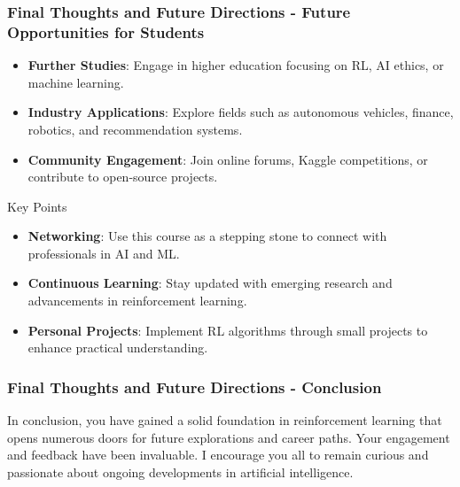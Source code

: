 \documentclass[aspectratio=169]{beamer}
\begin{document}
\begin{frame}[fragile]
    \frametitle{Final Thoughts and Future Directions - Future Opportunities for Students}
    \begin{itemize}
        \item \textbf{Further Studies}: 
        Engage in higher education focusing on RL, AI ethics, or machine learning.
        \item \textbf{Industry Applications}: 
        Explore fields such as autonomous vehicles, finance, robotics, and recommendation systems.
        \item \textbf{Community Engagement}: 
        Join online forums, Kaggle competitions, or contribute to open-source projects.
    \end{itemize}
    \begin{block}{Key Points}
        \begin{itemize}
            \item \textbf{Networking}: 
            Use this course as a stepping stone to connect with professionals in AI and ML.
            \item \textbf{Continuous Learning}: 
            Stay updated with emerging research and advancements in reinforcement learning.
            \item \textbf{Personal Projects}: 
            Implement RL algorithms through small projects to enhance practical understanding.
        \end{itemize}
    \end{block}
\end{frame}

\begin{frame}[fragile]
    \frametitle{Final Thoughts and Future Directions - Conclusion}
    In conclusion, you have gained a solid foundation in reinforcement learning that opens numerous doors for future explorations and career paths. Your engagement and feedback have been invaluable. I encourage you all to remain curious and passionate about ongoing developments in artificial intelligence.
\end{frame}
\end{document}
